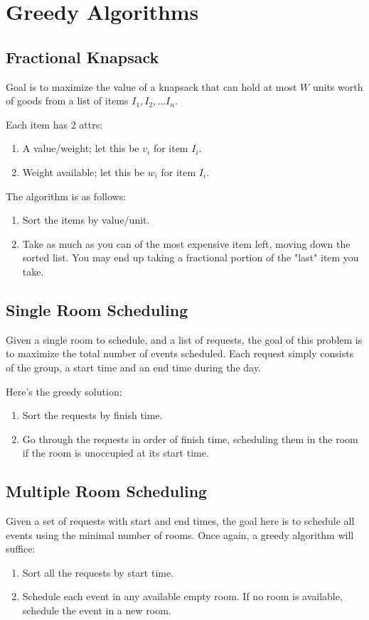 \section{Greedy Algorithms}
\subsection*{Fractional Knapsack}
Goal is to maximize the value of a knapsack that can hold at most $W$ units worth
of goods from a list of items $I_1,I_2, \dots I_n$.

Each item has 2 attrs:
\begin{enumerate}
    \item A value/weight; let this be $v_i$ for item $I_i$.
    \item Weight available; let this be $w_i$ for item $I_i$.
\end{enumerate}
The algorithm is as follows:
\begin{enumerate}
    \item Sort the items by value/unit.
    \item Take as much as you can of the most expensive item left,
        moving down the sorted list. You may end up taking a fractional portion
        of the "last" item you take.
\end{enumerate}
\subsection*{Single Room Scheduling}
Given a single room to schedule, and a list of requests, the goal of this problem
is to maximize the total number of events scheduled.
Each request simply consists of the group, a start time and an end time during the day.

Here's the greedy solution:
\begin{enumerate}
    \item Sort the requests by finish time.
    \item Go through the requests in order of finish time,
        scheduling them in the room if the room is unoccupied at its start time.
\end{enumerate}
\subsection*{Multiple Room Scheduling}
Given a set of requests with start and end times, the goal here is to schedule
all events using the minimal number of rooms.
Once again, a greedy algorithm will suffice:
\begin{enumerate}
    \item Sort all the requests by start time.
    \item Schedule each event in any available empty room.
        If no room is available, schedule the event in a new room.
\end{enumerate}
